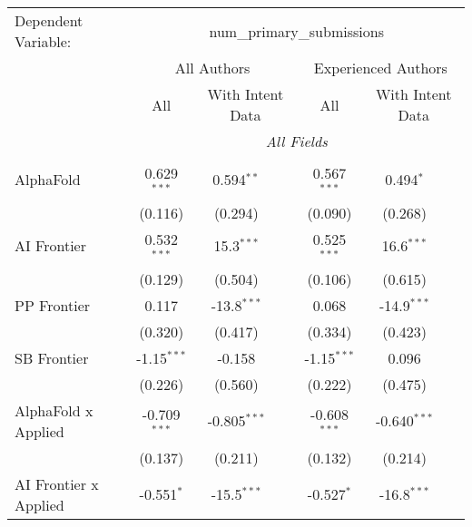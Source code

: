 \begingroup
\centering
\begin{tabular}{lcccccc}
   \tabularnewline \midrule \midrule
   Dependent Variable: & \multicolumn{6}{c}{num\_primary\_submissions}\\
 & \multicolumn{3}{c}{All Authors} & \multicolumn{3}{c}{Experienced Authors} \\
\cmidrule(lr){2-4} \cmidrule(lr){5-7}
 & \multicolumn{1}{c}{All} & \multicolumn{2}{c}{With Intent Data} & \multicolumn{1}{c}{All} & \multicolumn{2}{c}{With Intent Data} \\
\cmidrule(lr){2-2} \cmidrule(lr){3-4} \cmidrule(lr){5-5} \cmidrule(lr){6-7}
 & \multicolumn{6}{c}{\textit{All Fields}} \\ \\
   AlphaFold                      & 0.629$^{***}$  & 0.594$^{**}$   &               & 0.567$^{***}$  & 0.494$^{*}$    &   \\   
                                  & (0.116)        & (0.294)        &               & (0.090)        & (0.268)        &   \\   
   AI Frontier                    & 0.532$^{***}$  & 15.3$^{***}$   &               & 0.525$^{***}$  & 16.6$^{***}$   &   \\   
                                  & (0.129)        & (0.504)        &               & (0.106)        & (0.615)        &   \\   
   PP Frontier                    & 0.117          & -13.8$^{***}$  &               & 0.068          & -14.9$^{***}$  &   \\   
                                  & (0.320)        & (0.417)        &               & (0.334)        & (0.423)        &   \\   
   SB Frontier                    & -1.15$^{***}$  & -0.158         &               & -1.15$^{***}$  & 0.096          &   \\   
                                  & (0.226)        & (0.560)        &               & (0.222)        & (0.475)        &   \\   
   AlphaFold x Applied            & -0.709$^{***}$ & -0.805$^{***}$ &               & -0.608$^{***}$ & -0.640$^{***}$ &   \\   
                                  & (0.137)        & (0.211)        &               & (0.132)        & (0.214)        &   \\   
   AI Frontier x Applied          & -0.551$^{*}$   & -15.5$^{***}$  &               & -0.527$^{*}$   & -16.8$^{***}$  &   \\   

\end{tabular}
